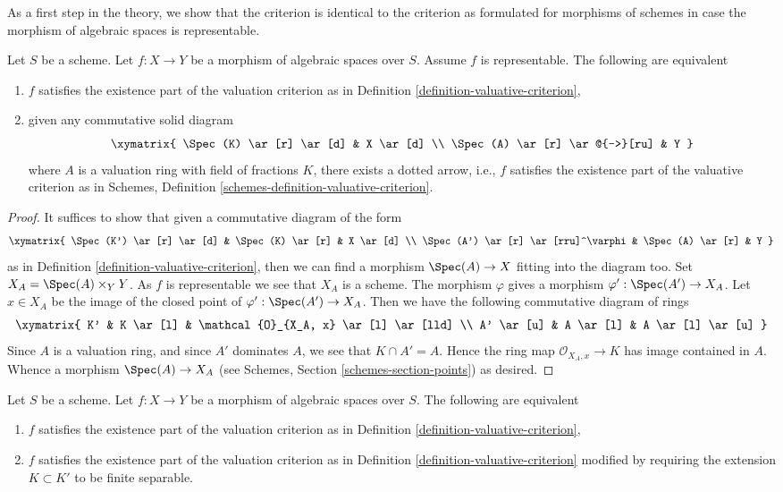 \medskip\noindent
As a first step in the theory, we show that the criterion is identical
to the criterion as formulated for morphisms of schemes
in case the morphism of algebraic spaces is representable.

\begin{lemma}
\label{lemma-valuative-criterion-representable}
Let $S$ be a scheme.
Let $f : X \to Y$ be a morphism of algebraic spaces over $S$.
Assume $f$ is representable. The following are equivalent
\begin{enumerate}
\item $f$ satisfies the existence part of the valuation criterion
as in Definition \ref{definition-valuative-criterion},
\item given any commutative solid diagram
$$
\xymatrix{
\Spec(K) \ar[r] \ar[d] & X \ar[d] \\
\Spec(A) \ar[r] \ar@{-->}[ru] & Y
}
$$
where $A$ is a valuation ring with field of fractions $K$, there exists
a dotted arrow, i.e., $f$ satisfies the existence part of the valuative
criterion as in
Schemes, Definition \ref{schemes-definition-valuative-criterion}.
\end{enumerate}
\end{lemma}

\begin{proof}
It suffices to show that given a commutative diagram of the form
$$
\xymatrix{
\Spec(K') \ar[r] \ar[d] & \Spec(K) \ar[r] & X \ar[d] \\
\Spec(A') \ar[r] \ar[rru]^\varphi & \Spec(A) \ar[r] & Y
}
$$
as in Definition \ref{definition-valuative-criterion}, then we can
find a morphism $\Spec(A) \to X$ fitting into the diagram too.
Set $X_A = \Spec(A) \times_Y Y$. As $f$ is representable we see
that $X_A$ is a scheme. The morphism $\varphi$ gives a morphism
$\varphi' : \Spec(A') \to X_A$. Let $x \in X_A$ be the image of
the closed point of $\varphi' : \Spec(A') \to X_A$. Then we
have the following commutative diagram of rings
$$
\xymatrix{
K' & K \ar[l] & \mathcal{O}_{X_A, x} \ar[l] \ar[lld] \\
A' \ar[u] & A \ar[l] & A \ar[l] \ar[u]
}
$$
Since $A$ is a valuation ring, and since $A'$ dominates $A$, we see
that $K \cap A' = A$. Hence the ring map $\mathcal{O}_{X_A, x} \to K$
has image contained in $A$. Whence a morphism $\Spec(A) \to X_A$ (see
Schemes, Section \ref{schemes-section-points})
as desired.
\end{proof}

\begin{lemma}
\label{lemma-finite-separable-enough}
Let $S$ be a scheme.
Let $f : X \to Y$ be a morphism of algebraic spaces over $S$.
The following are equivalent
\begin{enumerate}
\item $f$ satisfies the existence part of the valuation criterion
as in Definition \ref{definition-valuative-criterion},
\item $f$ satisfies the existence part of the valuation criterion
as in Definition \ref{definition-valuative-criterion} modified by
requiring the extension $K \subset K'$ to be finite separable.
\end{enumerate}
\end{lemma}

